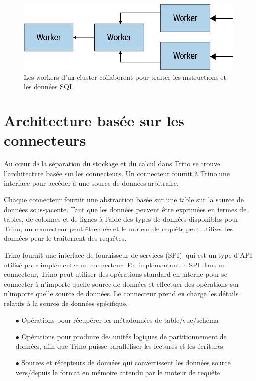 \begin{figure}[htbp]
\centering
\includegraphics[width=\linewidth]{images/trino_workers.png}
\caption{Les workers d'un cluster collaborent pour traiter les instructions et les données SQL}\label{fig:trino-workers}
\end{figure}

\section{Architecture basée sur les connecteurs}
Au cœur de la séparation du stockage et du calcul dans Trino se trouve l'architecture basée sur les connecteurs. Un connecteur fournit à Trino une interface pour accéder à une source de données arbitraire.

Chaque connecteur fournit une abstraction basée sur une table sur la source de données sous-jacente. Tant que les données peuvent être exprimées en termes de tables, de colonnes et de lignes à l'aide des types de données disponibles pour Trino, un connecteur peut être créé et le moteur de requête peut utiliser les données pour le traitement des requêtes.

Trino fournit une interface de fournisseur de services (SPI), qui est un type d'API utilisé pour implémenter un connecteur. En implémentant le SPI dans un connecteur, Trino peut utiliser des opérations standard en interne pour se connecter à n'importe quelle source de données et effectuer des opérations sur n'importe quelle source de données. Le connecteur prend en charge les détails relatifs à la source de données spécifique.

\begin{enumerate}
	\item[$\bullet$] Opérations pour récupérer les métadonnées de table/vue/schéma
	\item[$\bullet$] Opérations pour produire des unités logiques de partitionnement de données, afin que Trino puisse paralléliser les lectures et les écritures
	\item[$\bullet$] Sources et récepteurs de données qui convertissent les données source vers/depuis le format en mémoire attendu par le moteur de requête 
\end{enumerate}

